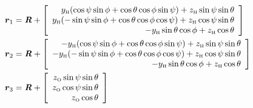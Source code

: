 \documentclass[aip,jcp,a4paper,reprint,onecolumn]{revtex4-1}
\newcommand{\vect}[1]{\textbf{\textit{#1}}}
\newcommand{\footh}{\textrm{\tiny H}}
\newcommand{\footo}{\textrm{\tiny O}}
\begin{document}
\begin{align}
  \vect r_1 &= \vect R
  +
  \left[
    \begin{array}{r}
      y_\footh(\cos\psi \sin\phi + \cos\theta \cos\phi \sin\psi) +
      z_\footh \sin\psi \sin\theta\\
      y_\footh (-\sin\psi \sin\phi + \cos\theta \cos\phi \cos\psi) +
      z_\footh \cos\psi \sin\theta \\
      - y_\footh \sin\theta \cos\phi + z_\footh \cos\theta
    \end{array}
  \right] \\
  \vect r_2 &= \vect R
  +
  \left[
    \begin{array}{r}
      -y_\footh(\cos\psi \sin\phi + \cos\theta \cos\phi \sin\psi) +
      z_\footh \sin\psi \sin\theta\\
      -y_\footh (-\sin\psi \sin\phi + \cos\theta \cos\phi \cos\psi) +
      z_\footh \cos\psi \sin\theta \\
      - y_\footh \sin\theta \cos\phi + z_\footh \cos\theta
    \end{array}
  \right]\\
  \vect r_3 &= \vect R
  +
  \left[
    \begin{array}{r}
      z_\footo \sin\psi \sin\theta\\
      z_\footo \cos\psi \sin\theta \\
      z_\footo \cos\theta
    \end{array}
  \right]
\end{align}
\end{document}
